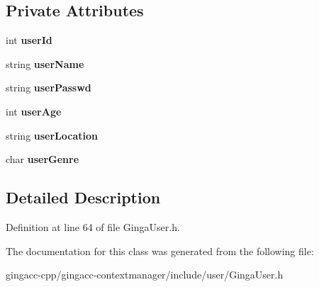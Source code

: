 \subsection*{Private Attributes}
\begin{CompactItemize}
\item 
int {\bf userId}\label{classbr_1_1pucrio_1_1telemidia_1_1ginga_1_1core_1_1contextmanager_1_1GingaUser_c8c70e21f7c80cb50c1be576eb09d6c7}

\item 
string {\bf userName}\label{classbr_1_1pucrio_1_1telemidia_1_1ginga_1_1core_1_1contextmanager_1_1GingaUser_54e4b2d6a81897e2e905a88d3af6d41d}

\item 
string {\bf userPasswd}\label{classbr_1_1pucrio_1_1telemidia_1_1ginga_1_1core_1_1contextmanager_1_1GingaUser_4c9ef2b263ab3903d7fbaa601bc81f4c}

\item 
int {\bf userAge}\label{classbr_1_1pucrio_1_1telemidia_1_1ginga_1_1core_1_1contextmanager_1_1GingaUser_0c3a5e73cef5320cff07a5d56bb341d4}

\item 
string {\bf userLocation}\label{classbr_1_1pucrio_1_1telemidia_1_1ginga_1_1core_1_1contextmanager_1_1GingaUser_22a77b919114a1d8de8bf3980764df07}

\item 
char {\bf userGenre}\label{classbr_1_1pucrio_1_1telemidia_1_1ginga_1_1core_1_1contextmanager_1_1GingaUser_513cd49f4682e9620151d0193b25e638}

\end{CompactItemize}


\subsection{Detailed Description}




Definition at line 64 of file GingaUser.h.

The documentation for this class was generated from the following file:\begin{CompactItemize}
\item 
gingacc-cpp/gingacc-contextmanager/include/user/GingaUser.h\end{CompactItemize}
